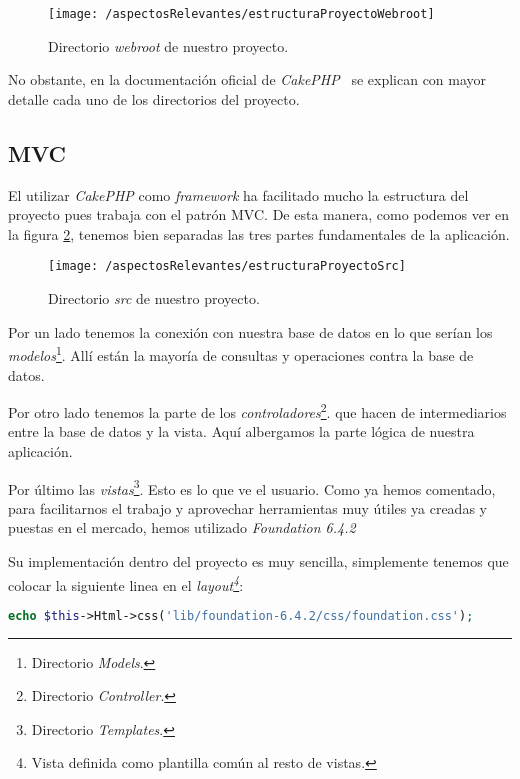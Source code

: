 \begin{figure}[ht]
	\centering
	\texttt{[image: /aspectosRelevantes/estructuraProyectoWebroot]}
	\caption{Directorio \textit{webroot} de nuestro proyecto.}
	\label{fig:estructuraProyectoWebroot}
\end{figure}

No obstante, en la documentación oficial de \textit{CakePHP}~\cite{web:estructuraCarpetasCakePHP} se explican con mayor detalle cada uno de los directorios del proyecto.

\subsection{MVC}

El utilizar \textit{CakePHP} como \textit{framework} ha facilitado mucho la estructura del proyecto pues trabaja con el patrón MVC. De esta manera, como podemos ver en la figura \ref{fig:estructuraProyectoSrc}, tenemos bien separadas las tres partes fundamentales de la aplicación. 

\begin{figure}[ht]
	\centering
	\texttt{[image: /aspectosRelevantes/estructuraProyectoSrc]}
	\caption{Directorio \textit{src} de nuestro proyecto.}
	\label{fig:estructuraProyectoSrc}
\end{figure}

Por un lado tenemos la conexión con nuestra base de datos en lo que serían los \textit{modelos}\footnote{Directorio \textit{Models}.}. Allí están la mayoría de consultas y operaciones contra la base de datos. 

Por otro lado tenemos la parte de los \textit{controladores}\footnote{Directorio \textit{Controller}.}. que hacen de intermediarios entre la base de datos y la vista. Aquí albergamos la parte lógica de nuestra aplicación.

Por último las \textit{vistas}\footnote{Directorio \textit{Templates}.}. Esto es lo que ve el usuario. Como ya hemos comentado, para facilitarnos el trabajo y aprovechar herramientas muy útiles ya creadas y puestas en el mercado, hemos utilizado \textit{Foundation 6.4.2}

Su implementación dentro del proyecto es muy sencilla, simplemente tenemos que colocar la siguiente linea en el \textit{layout\footnote{Vista definida como plantilla común al resto de vistas.}}:

\begin{lstlisting}[language=php]
echo $this->Html->css('lib/foundation-6.4.2/css/foundation.css');
\end{lstlisting}